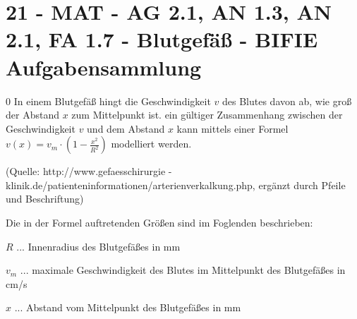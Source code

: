 \section{21 - MAT - AG 2.1, AN 1.3, AN 2.1, FA 1.7 - Blutgefäß - BIFIE Aufgabensammlung}

\begin{langesbeispiel} \item[0] %
				In einem Blutgefäß hingt die Geschwindigkeit $v$ des Blutes davon ab, wie groß der Abstand $x$ zum Mittelpunkt ist. ein gültiger Zusammenhang zwischen der Geschwindigkeit $v$ und dem Abstand $x$ kann mittels einer Formel $v(x)=v_m\cdot (1-\frac{x^2}{R^2})$ modelliert werden.
				
				\begin{center}\end{center}
				
				\begin{singlespace}
\begin{tiny}
(Quelle: http://www.gefaesschirurgie
-klinik.de/patienteninformationen/arterienverkalkung.php, ergänzt durch Pfeile und Beschriftung) 
\end{tiny}
\end{singlespace}

Die in der Formel auftretenden Größen sind im Foglenden beschrieben:\leer

$R$ ... Innenradius des Blutgefäßes in mm

$v_m$ ... maximale Geschwindigkeit des Blutes im Mittelpunkt des Blutgefäßes in cm/s

$x$ ... Abstand vom Mittelpunkt des Blutgefäßes in mm


\end{langesbeispiel}

